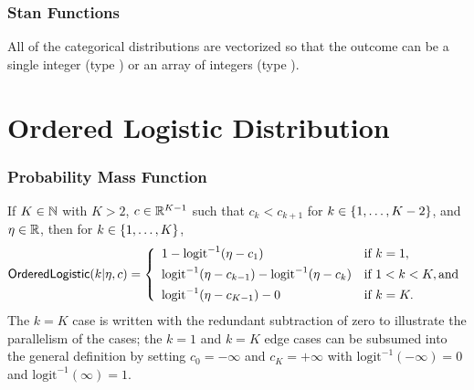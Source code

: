 \subsubsection{Stan Functions}

All of the categorical distributions are vectorized so that the
outcome  can be a single integer (type ) or an array
of integers (type ).


\begin{description}
%
%
\end{description}
%
\begin{description}
\end{description}
%
\begin{description}
\end{description}

\section{Ordered Logistic Distribution}

\subsubsection{Probability Mass Function}

If $K \in \mathbb{N}$ with $K > 2$, $c \in \mathbb{R}^{K-1}$ such that $c_k <
c_{k+1}$ for $k \in \{ 1,\ldots,K-2 \}$, and $\eta \in \mathbb{R}$, then for $k \in
\{ 1,\ldots,K \}$,
\[
\mbox{\sf OrderedLogistic}(k|\eta,c)
=
\left\{
\begin{array}{ll}
1 - \mbox{logit}^{-1}(\eta - c_1) & \mbox{if } k = 1,
\\[4pt]
\mbox{logit}^{-1}(\eta - c_{k-1}) - \mbox{logit}^{-1}(\eta -
c_{k})

& \mbox{if } 1 < k < K, \mbox{and}
\\[4pt]
\mbox{logit}^{-1}(\eta - c_{K-1}) - 0
& \mbox{if } k = K.
\end{array}
\right.
\]
%
The $k=K$ case is written with the redundant subtraction of zero to
illustrate the parallelism of the cases; the $k=1$ and $k=K$ edge
cases can be subsumed into the general definition by setting $c_0 =
-\infty$ and $c_K = +\infty$ with $\mbox{logit}^{-1}(-\infty) = 0$ and
$\mbox{logit}^{-1}(\infty) = 1$.

